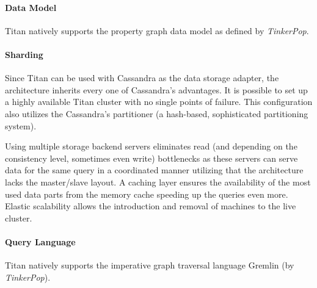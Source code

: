 \paragraph{Data Model}
Titan natively supports the property graph data model as defined by \emph{TinkerPop}.

\paragraph{Sharding}
Since Titan can be used with Cassandra as the data storage adapter, the architecture inherits every one of Cassandra's advantages. It is possible to set up a highly available Titan cluster with no single points of failure. This configuration also utilizes the Cassandra's partitioner (a hash-based, sophisticated partitioning system).

Using multiple storage backend servers eliminates read (and depending on the consistency level, sometimes even write) bottlenecks as these servers can serve data for the same query in a coordinated manner utilizing that the architecture lacks the master/slave layout. A caching layer ensures the availability of the most used data parts from the memory cache speeding up the queries even more. Elastic scalability allows the introduction and removal of machines to the live cluster.


\paragraph{Query Language}
Titan natively supports the imperative graph traversal language Gremlin (by \emph{TinkerPop}).



